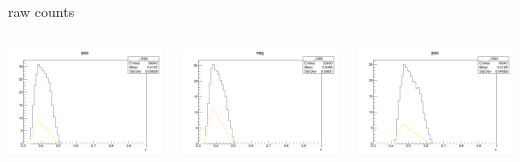 \begin{frame}{raw counts}
\begin{columns}
\begin{column}[T]{0.25\textwidth}
\includegraphics[width = \textwidth]{results/yield/statistics/yield_x_Q2_z_0.35_4.000_0.40_pos.png}
\end{column}
\begin{column}[T]{0.25\textwidth}
\includegraphics[width = \textwidth]{results/yield/statistics/yield_x_Q2_z_0.35_4.000_0.40_neg.png}
\end{column}
\begin{column}[T]{0.25\textwidth}
\includegraphics[width = \textwidth]{results/yield/statistics/yield_x_Q2_z_0.35_4.000_0.50_pos.png}

\end{column}
\end{columns}
\end{frame}
